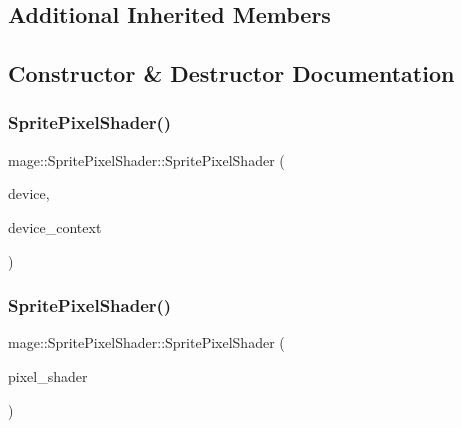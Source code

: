 \subsection*{Additional Inherited Members}


\subsection{Constructor \& Destructor Documentation}
\hypertarget{classmage_1_1_sprite_pixel_shader_abffbb811fa7b34e538748ae5d082aec4}{}\label{classmage_1_1_sprite_pixel_shader_abffbb811fa7b34e538748ae5d082aec4} 
\subsubsection{\texorpdfstring{Sprite\+Pixel\+Shader()}{SpritePixelShader()}\hspace{0.1cm}{\footnotesize\ttfamily [1/3]}}
{\footnotesize\ttfamily mage\+::\+Sprite\+Pixel\+Shader\+::\+Sprite\+Pixel\+Shader (\begin{DoxyParamCaption}\item[{I\+D3\+D11\+Device2 $\ast$}]{device,  }\item[{I\+D3\+D11\+Device\+Context2 $\ast$}]{device\+\_\+context }\end{DoxyParamCaption})\hspace{0.3cm}{\ttfamily [explicit]}}

\hypertarget{classmage_1_1_sprite_pixel_shader_a5803ea69e04c58528f9c4fbbc0f4efbc}{}\label{classmage_1_1_sprite_pixel_shader_a5803ea69e04c58528f9c4fbbc0f4efbc} 
\subsubsection{\texorpdfstring{Sprite\+Pixel\+Shader()}{SpritePixelShader()}\hspace{0.1cm}{\footnotesize\ttfamily [2/3]}}
{\footnotesize\ttfamily mage\+::\+Sprite\+Pixel\+Shader\+::\+Sprite\+Pixel\+Shader (\begin{DoxyParamCaption}\item[{const \hyperlink{classmage_1_1_sprite_pixel_shader}{Sprite\+Pixel\+Shader} \&}]{pixel\+\_\+shader }\end{DoxyParamCaption})\hspace{0.3cm}{\ttfamily [delete]}}

